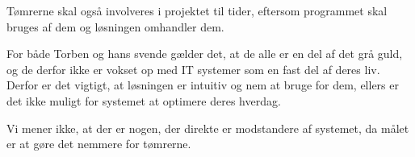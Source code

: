Tømrerne skal også involveres i projektet til tider, eftersom programmet skal bruges af dem og løsningen omhandler dem.

For både Torben og hans svende gælder det, at de alle er en del af det grå guld, og de derfor ikke er vokset op med IT systemer som en fast del af deres liv.
Derfor er det vigtigt, at løsningen er intuitiv og nem at bruge for dem, ellers er det ikke muligt for systemet at optimere deres hverdag.

Vi mener ikke, at der er nogen, der direkte er modstandere af systemet, da målet er at gøre det nemmere for tømrerne.